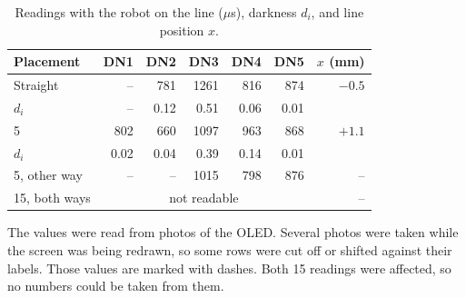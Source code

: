 \documentclass[11pt]{article}
\begin{document}
\begin{table}[H]
  \centering
  \caption{Readings with the robot on the line ($\mu$s), darkness $d_i$, and line position $x$.}
  \label{tab:angle}
  \begin{tabular}{lrrrrrr}
    \toprule
    Placement & DN1 & DN2 & DN3 & DN4 & DN5 & $x$ (mm) \\
    \midrule
    Straight   & --  & 781  & 1261 & 816  & 874  & $-0.5$ \\
    \quad $d_i$ & --  & 0.12 & 0.51 & 0.06 & 0.01 & \\
    5\textdegree{} & 802 & 660 & 1097 & 963 & 868 & $+1.1$ \\
    \quad $d_i$ & 0.02 & 0.04 & 0.39 & 0.14 & 0.01 & \\
    5\textdegree{}, other way & -- & -- & 1015 & 798 & 876 & -- \\
    15\textdegree{}, both ways & \multicolumn{5}{c}{not readable} & -- \\
    \bottomrule
  \end{tabular}
\end{table}

The values were read from photos of the OLED. Several photos were taken while the screen was being redrawn, so some rows were cut off or shifted against their labels. Those values are marked with dashes. Both 15\textdegree{} readings were affected, so no numbers could be taken from them.
\end{document}
